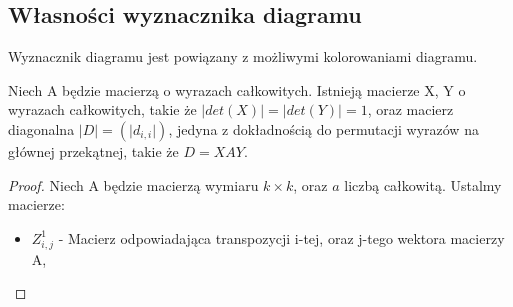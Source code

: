 \subsection{Własności wyznacznika diagramu}
Wyznacznik diagramu jest powiązany z możliwymi kolorowaniami diagramu.

\begin{lemat}
Niech A będzie macierzą o wyrazach całkowitych. Istnieją macierze X, Y o wyrazach całkowitych, takie że $\vert det(X) \vert= \vert det(Y) \vert=1$, oraz macierz diagonalna $\vert D \vert=(\vert d_{i,i} \vert)$, jedyna z dokładnością do permutacji wyrazów na głównej przekątnej, takie że $D=XAY$.
\end{lemat}
\begin{proof}
Niech A będzie macierzą wymiaru $k \times k$, oraz  $a$ liczbą całkowitą. Ustalmy macierze:
\begin{itemize}
\item $Z^1_{i,j}$  -  Macierz odpowiadająca transpozycji i-tej, oraz j-tego wektora macierzy A,


\end{itemize}
\end{proof}
